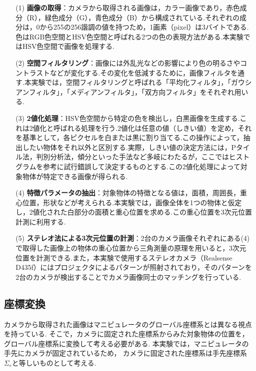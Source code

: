\begin{enumerate}
  \item[(1)] \textbf{画像の取得}：カメラから取得される画像は，カラー画像であり，赤色成分（R），緑色成分（G），青色成分（B）から構成されている.それぞれの成分は，0から255の256諧調の値を持つため，1画素（pixel）は3バイトである.色はRGB色空間とHSV色空間と呼ばれる2つの色の表現方法がある.本実験ではHSV色空間で画像を処理する.
    
  \item[(2)] \textbf{空間フィルタリング}：画像には外乱光などの影響により色の明るさやコントラストなどが変化する.その変化を低減するために，画像フィルタを通す.本実験では，空間フィルタリングと呼ばれる「平均化フィルタ」，「ガウシアンフィルタ」，「メディアンフィルタ」，「双方向フィルタ」をそれぞれ用いる.
    
  \item[(3)] \textbf{2値化処理}：HSV色空間から特定の色を検出し，白黒画像を生成する.これは2値化と呼ばれる処理を行う.2値化は任意の値（しきい値）を定め，それを基準として，各ピクセルを白または黒に割り当てる.この操作によって，抽出したい物体をそれ以外と区別する.実際，しきい値の決定方法には，Pタイル法，判別分析法，傾分といった手法など多岐にわたるが，ここではヒストグラムを参考に試行錯誤して決定するものとする.この2値化処理によって対象物体が特定できる画像が得られる.
    
  \item[(4)] \textbf{特徴パラメータの抽出}：対象物体の特徴となる値は，面積，周囲長，重心位置，形状などが考えられる.本実験では，画像全体を1つの物体と仮定し，2値化された白部分の面積と重心位置を求める.この重心位置を3次元位置計測に利用する.
    
  \item[(5)] \textbf{ステレオ法による3次元位置の計測}：2台のカメラ画像それぞれにある(4)で取得した画像上の物体の重心位置から三角測量の原理を用いると，3次元位置を計測できる.また，本実験で使用するステレオカメラ（Realsense D435f）にはプロジェクタによるパターンが照射されており，そのパターンを2台のカメラが検出することでカメラ画像同士のマッチングを行っている.
\end{enumerate}

\subsection{座標変換}
カメラから取得された画像はマニピュレータのグローバル座標系とは異なる視点を持っている.
そこで，カメラに固定された座標系からみた対象物体の位置を，
グローバル座標系に変換して考える必要がある.
本実験では，マニピュレータの手先にカメラが固定されているため，
カメラに固定された座標系は手先座標系$\Sigma_e$と等しいものとして考える.

